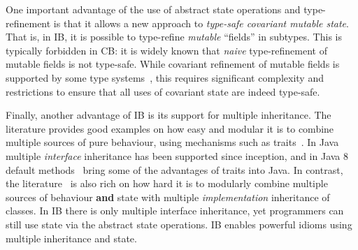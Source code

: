 One important advantage of the use of abstract state operations and
type-refinement is that it allows a new approach to
\emph{type-safe covariant mutable state}. That is, in IB,
it is possible to type-refine \emph{mutable} ``fields'' in subtypes. This is
typically forbidden in CB: it is widely known that \emph{naive} type-refinement of
mutable fields is not type-safe. While covariant refinement of mutable
fields is supported by some type systems~\cite{bruce98astatically,bruce1994paradigmatic,ernst06virtual,Saito2013933}, this requires
significant complexity and restrictions to ensure that all uses of
covariant state are indeed type-safe. 

\begin{comment}
\marcoT{%

In this paper we show how to support type-safe
\textbf{field removal},
\textbf{field type refinement} allowing a kind of covariant setters refinement,
and \textbf{multiple inheritance}.}
\end{comment}

Finally, another advantage of IB is its support for
multiple inheritance. The literature provides good examples on how
easy and modular it is to combine multiple sources of pure behaviour,
using mechanisms such as traits~\cite{scharli03traits}. In Java
multiple \emph{interface} inheritance has been supported since
inception, and in Java 8 default methods~\cite{goetz12fdefenders} bring some of the
advantages of traits into Java. In contrast, the literature~\cite{Sak89dis,bracha90mixin,malayeri2009cz}
is also rich on how hard it is to modularly combine multiple sources
of behaviour \textbf{and} state with multiple \emph{implementation}
inheritance of classes. In IB there is only multiple
interface inheritance, yet programmers can still use state via the
abstract state operations. IB enables powerful 
idioms using multiple inheritance and state.



